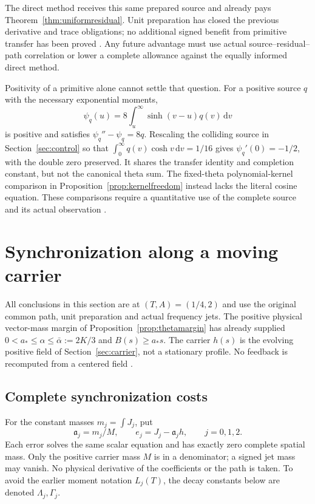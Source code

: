 \documentclass[11pt]{article}
\numberwithin{equation}{section}
\newcommand{\dd}{\,\mathrm d}
\begin{document}
The direct method receives this same prepared source and already pays
Theorem~\ref{thm:uniformresidual}. Unit preparation has closed the
previous derivative and trace obligations; no additional signed benefit
from primitive transfer has been proved \cite{PrimitiveTestNote}.
Any future advantage must use actual source--residual--path correlation
or lower a complete allowance against the equally informed direct method.

Positivity of a primitive alone cannot settle that question.
For a positive source $q$ with the necessary exponential moments,
\[
 \psi_q(u)=8\int_u^\infty\sinh(v-u)q(v)\dd v
\]
is positive and satisfies $\psi_q''-\psi_q=8q$.
Rescaling the colliding source in Section~\ref{sec:control} so that
$\int_0^\infty q(v)\cosh v\dd v=1/16$ gives
$\psi_q'(0)=-1/2$, with the double zero preserved.
It shares the transfer identity and completion constant, but not the
canonical theta sum. The fixed-theta polynomial-kernel comparison in
Proposition~\ref{prop:kernelfreedom} instead lacks the literal cosine
equation. These comparisons require a quantitative use of the
complete source and its actual observation \cite{PrimitivePairingNote}.


\section{Synchronization along a moving carrier}\label{sec:commoncarrier}

All conclusions in this section are at $(T,A)=(1/4,2)$ and use the
original common path, unit preparation and actual frequency jets.
The positive physical vector-mass margin of
Proposition~\ref{prop:thetamargin} has already supplied
$0<a_*\le\alpha\le\bar\alpha:=2K/3$ and $B(s)\ge a_*s$.
The carrier $h(s)$ is the evolving positive field of
Section~\ref{sec:carrier}, not a stationary profile. No feedback is
recomputed from a centered field \cite{CarrierSynchronizationNote}.

\subsection{Complete synchronization costs}

For the constant masses $m_j=\int J_j$, put
\begin{equation}\label{eq:commoncarriererrors}
 \mathfrak a_j=m_j/M,\qquad e_j=J_j-\mathfrak a_jh,
 \qquad j=0,1,2.
\end{equation}
Each error solves the same scalar equation and has exactly zero complete
spatial mass. Only the positive carrier mass $M$ is in a denominator;
a signed jet mass may vanish. No physical derivative of the coefficients
or the path is taken. To avoid the earlier moment notation $L_j(T)$,
the decay constants below are denoted $\Lambda_j,\Gamma_j$.
\end{document}
